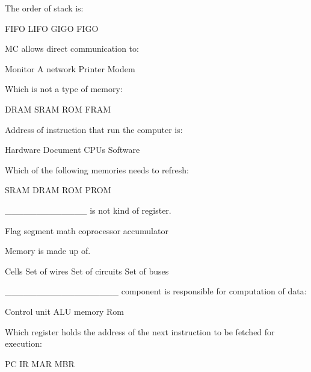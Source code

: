 \documentclass{exam}
\begin{document}
\begin{questions}
The order of stack is:\\
\begin{oneparchoices}
\choice FIFO
\choice LIFO
\choice GIGO
\choice FIGO
\end{oneparchoices}
\question 

MC allows direct communication to:\\
\begin{oneparchoices}
\choice Monitor
\choice A network
\choice Printer
\choice Modem
\end{oneparchoices}
\question 

Which is not a type of memory:\\
\begin{oneparchoices}
\choice DRAM
\choice SRAM
\choice ROM
\choice FRAM
\end{oneparchoices}
\question 

Address of instruction that run the computer is:\\
\begin{oneparchoices}
\choice Hardware
\choice Document
\choice CPUs
\choice Software
\end{oneparchoices}
\question 

Which of the following memories needs to refresh:\\
\begin{oneparchoices}
\choice SRAM
\choice DRAM
\choice ROM
\choice PROM
\end{oneparchoices}
\question 

\_\_\_\_\_\_\_\_\_\_\_\_\_ is not kind of register.\\
\begin{oneparchoices}
\choice Flag
\choice segment
\choice math coprocessor
\choice accumulator
\end{oneparchoices}
\question 

Memory is made up of.\\
\begin{oneparchoices}
\choice Cells
\choice Set of wires
\choice Set of circuits
\choice Set of buses
\end{oneparchoices}
\question 

\_\_\_\_\_\_\_\_\_\_\_\_\_\_\_\_\_\_ component is responsible for computation of data:\\
\begin{oneparchoices}
\choice Control unit
\choice ALU
\choice memory
\choice Rom
\end{oneparchoices}
\question 

Which register holds the address of the next instruction to be fetched for execution:\\
\begin{oneparchoices}
\choice PC
\choice IR
\choice MAR
\choice MBR
\end{oneparchoices}
\question 


\end{questions}
\end{document}
